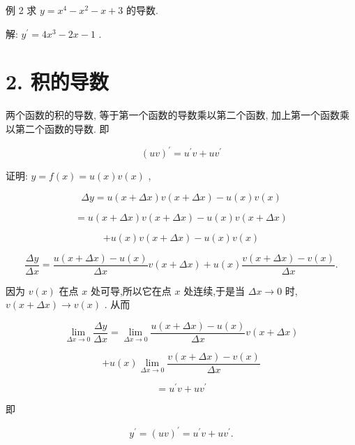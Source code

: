 \documentclass[lang=cn,newtx,10pt,scheme=chinese]{elegantbook}
\begin{document}
例 2 求 \(y = {x}^{4} - {x}^{2} - x + 3\) 的导数.

解: \({y}^{\prime } = 4{x}^{3} - {2x} - 1\) .

\section*{2. 积的导数}

\begin{proposition}[法则2(乘法法则)]

两个函数的积的导数, 等于第一个函数的导数乘以第二个函数, 加上第一个函数乘以第二个函数的导数. 即

\[
{\left( uv\right) }^{\prime } = {u}^{\prime }v + u{v}^{\prime }
\]

\end{proposition}

证明: \(y = f\left( x\right) = u\left( x\right) v\left( x\right)\) ,

\[
{\Delta y} = u\left( {x + {\Delta x}}\right) v\left( {x + {\Delta x}}\right) - u\left( x\right) v\left( x\right)
\]

\[
= u\left( {x + {\Delta x}}\right) v\left( {x + {\Delta x}}\right) - u\left( x\right) v\left( {x + {\Delta x}}\right)
\]

\[
+ u\left( x\right) v\left( {x + {\Delta x}}\right) - u\left( x\right) v\left( x\right)
\]

\[
\frac{\Delta y}{\Delta x} = \frac{u\left( {x + {\Delta x}}\right) - u\left( x\right) }{\Delta x}v\left( {x + {\Delta x}}\right) + u\left( x\right) \frac{v\left( {x + {\Delta x}}\right) - v\left( x\right) }{\Delta x}.
\]

因为 \(v\left( x\right)\) 在点 \(x\) 处可导,所以它在点 \(x\) 处连续,于是当 \({\Delta x} \rightarrow 0\) 时, \(v\left( {x + {\Delta x}}\right) \rightarrow v\left( x\right)\) . 从而

\[
\mathop{\lim }\limits_{{{\Delta x} \rightarrow 0}}\frac{\Delta y}{\Delta x} = \mathop{\lim }\limits_{{{\Delta x} \rightarrow 0}}\frac{u\left( {x + {\Delta x}}\right) - u\left( x\right) }{\Delta x}v\left( {x + {\Delta x}}\right)
\]

\[
+ u\left( x\right) \mathop{\lim }\limits_{{{\Delta x} \rightarrow 0}}\frac{v\left( {x + {\Delta x}}\right) - v\left( x\right) }{\Delta x}
\]

\[
= {u}^{\prime }v + u{v}^{\prime }
\]

即

\[
{y}^{\prime } = {\left( uv\right) }^{\prime } = {u}^{\prime }v + u{v}^{\prime }.
\]
\end{document}
